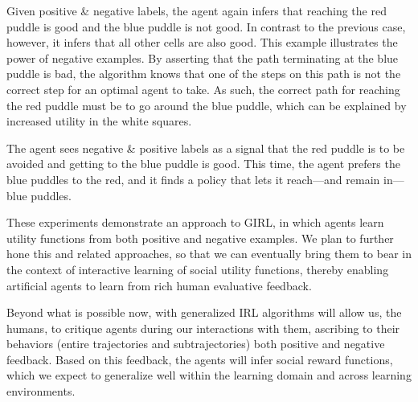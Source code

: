 Given positive \& negative labels, the agent again infers that
reaching the red puddle is good and the blue puddle is not
good. In contrast to the previous case, however, it infers that all
other cells are also good. This example illustrates the power of
negative examples. By asserting that the path terminating at the blue
puddle is bad, the algorithm knows that one of the steps on this path
is not the correct step for an optimal agent to take. As such, the
correct path for reaching the red puddle must be to go around the blue
puddle, which can be explained by increased utility in the white
squares.

The agent sees negative \& positive labels as a signal that the red
puddle is to be avoided and getting to the blue puddle is good.  This
time, the agent prefers the blue puddles to the red, and it finds a
policy that lets it reach---and remain in---blue puddles.


These experiments demonstrate an approach to GIRL, in which agents
learn utility functions from both positive and negative examples.
We plan to further hone this and related approaches, so that we can
eventually bring them to bear in the context of interactive learning
of social utility functions, thereby enabling artificial agents to
learn from rich human evaluative feedback.

Beyond what is possible now, with generalized IRL algorithms will allow us, the humans,
to critique agents during our interactions with them, 
ascribing to their behaviors (entire trajectories and subtrajectories)
both positive and negative feedback. Based on this feedback, the agents will
infer social reward functions, which we expect to generalize well
within the learning domain and across learning environments.
